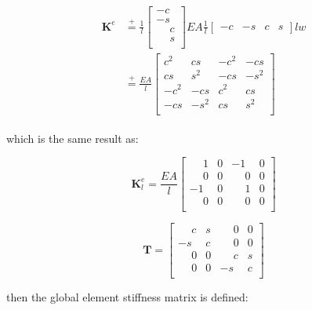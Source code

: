 \documentclass[10pt,b5paper,titlepage]{book}
\newcommand{\m}{\mathbf}
\newcommand*\eqp{\stackrel{+}{=}}
\newenvironment{eqarray}
{
    \begin{eqnarray}
        \begin{aligned}
}
{
        \end{aligned}
    \end{eqnarray}
}
\begin{document}
\begin{eqarray}
    \m{K}^e &\eqp
    \frac{1}{l}
    \begin{bmatrix}
        -c \\
        -s \\
        \phantom{-}c \\
        \phantom{-}s \\
    \end{bmatrix}
    EA
    \frac{1}{l}
    \begin{bmatrix}
        -c & -s & c & s
    \end{bmatrix}
    l w \\
    &\eqp
    \frac{EA}{l}
    \begin{bmatrix}
        c^2 & c s & -c^2 & -cs \\
        cs & s^2 & -cs & -s^2 \\
        -c^2 & -c s & c^2 & cs \\
        -cs & -s^2 & cs & s^2 \\
    \end{bmatrix}
\end{eqarray}

which is the same result as:

\begin{equation}
    \m{K}_l^e = \frac{EA}{l}
    \begin{bmatrix}
        \phantom{-}1 & 0 & -1 & 0 \\
        \phantom{-}0 & 0 & \phantom{-}0 & 0 \\
        -1 & 0 & \phantom{-}1 & 0 \\
        \phantom{-}0 & 0 & \phantom{-}0 & 0 \\
    \end{bmatrix}
\end{equation}

\begin{equation}
    \m{T} = \begin{bmatrix}
        \phantom{-}c & s & \phantom{-}0 & 0 \\
        -s & c & \phantom{-}0 & 0 \\
        \phantom{-}0 & 0 & \phantom{-}c & s \\
        \phantom{-}0 & 0 & -s & c \\
    \end{bmatrix}
\end{equation}

then the global element stiffness matrix is defined:
\end{document}
